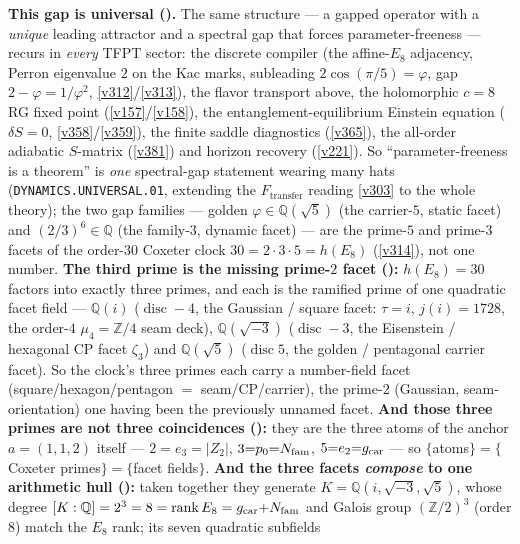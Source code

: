 \par\smallskip\noindent\textbf{This gap is universal ().} The same structure
--- a gapped operator with a \emph{unique} leading attractor and a spectral gap that forces parameter-freeness ---
recurs in \emph{every} TFPT sector: the discrete compiler (the affine-$E_8$ adjacency, Perron eigenvalue $2$ on the
Kac marks, subleading $2\cos(\pi/5)=\varphi$, gap $2-\varphi=1/\varphi^2$, \vref{v312}/\vref{v313}), the flavor
transport above, the holomorphic $c{=}8$ RG fixed point (\vref{v157}/\vref{v158}), the entanglement-equilibrium
Einstein equation ($\delta S{=}0$, \vref{v358}/\vref{v359}), the finite saddle diagnostics (\vref{v365}), the all-order
adiabatic $S$-matrix (\vref{v381}) and horizon recovery (\vref{v221}). So ``parameter-freeness is a theorem'' is
\emph{one} spectral-gap statement wearing many hats (\texttt{DYNAMICS.UNIVERSAL.01}, extending the
$F_{\mathrm{transfer}}$ reading \vref{v303} to the whole theory); the two gap families --- golden
$\varphi\in\mathbb Q(\sqrt5)$ (the carrier-$5$, static facet) and $(2/3)^6\in\mathbb Q$ (the family-$3$, dynamic
facet) --- are the prime-$5$ and prime-$3$ facets of the order-$30$ Coxeter clock $30=2{\cdot}3{\cdot}5=h(E_8)$
(\vref{v314}), not one number. \textbf{The third prime is the missing prime-$2$ facet ():}
$h(E_8)=30$ factors into exactly three primes, and each is the ramified prime of one quadratic facet field ---
$\mathbb Q(i)$ ($\operatorname{disc}-4$, the Gaussian / square facet: $\tau=i$, $j(i)=1728$, the order-$4$
$\mu_4=\mathbb Z/4$ seam deck), $\mathbb Q(\sqrt{-3})$ ($\operatorname{disc}-3$, the Eisenstein / hexagonal CP
facet $\zeta_3$) and $\mathbb Q(\sqrt5)$ ($\operatorname{disc}5$, the golden / pentagonal carrier facet). So the
clock's three primes each carry a number-field facet (square/hexagon/pentagon $=$ seam/CP/carrier), the prime-$2$
(Gaussian, seam-orientation) one having been the previously unnamed facet. \textbf{And those three primes are not
three coincidences ():} they are the three atoms of the anchor $a=(1,1,2)$ itself ---
$2{=}e_3{=}|Z_2|$, $3{=}p_0{=}N_{\mathrm{fam}}$, $5{=}e_2{=}g_{\mathrm{car}}$ --- so $\{$atoms$\}=\{$Coxeter primes$\}=\{$facet fields$\}$.
\textbf{And the three facets \emph{compose} to one arithmetic hull ():} taken
together they generate $K=\mathbb Q(i,\sqrt{-3},\sqrt5)$, whose degree $[K:\mathbb Q]=2^3=8=\operatorname{rank}E_8
=g_{\mathrm{car}}{+}N_{\mathrm{fam}}$ and Galois group $(\mathbb Z/2)^3$ (order $8$) match the $E_8$ rank; its seven quadratic subfields
